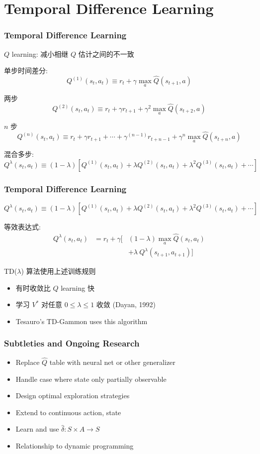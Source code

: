 \documentclass{beamer}
\begin{document}
\section{Temporal Difference Learning}
\label{sec-5}
\begin{frame}
\frametitle{Temporal Difference Learning}
\label{sec-5-1}

$Q$ learning: 减小相继 $Q$ 估计之间的不一致

单步时间差分:
\[Q^{(1)}(s_t,a_t) \equiv r_t + \gamma \max_{a} \hat{Q}(s_{t+1},a)\]

两步
\[Q^{(2)}(s_t,a_t) \equiv r_t + \gamma r_{t+1} + \gamma^2 \max_{a}\hat{Q}(s_{t+2},a) \]

 $n$ 步
\[ Q^{(n)}(s_t,a_t) \equiv r_t + \gamma r_{t+1} + \cdots + \gamma^{(n-1)}r_{t+n-1} + \gamma^n \max_{a}\hat{Q}(s_{t+n},a) \]

混合多步:
\[Q^{\lambda}(s_{t},a_{t})  \equiv (1- \lambda) \left[
Q^{(1)}(s_t,a_t) + \lambda Q^{(2)}(s_t,a_t) + \lambda^2 Q^{(3)}(s_t,a_t) +
\cdots \right] \]
\end{frame}
\begin{frame}
\frametitle{Temporal Difference Learning}
\label{sec-5-2}

\[Q^{\lambda}(s_{t},a_{t})  \equiv (1- \lambda) \left[
Q^{(1)}(s_t,a_t) + \lambda Q^{(2)}(s_t,a_t) + \lambda^2 Q^{(3)}(s_t,a_t) +
\cdots \right] \]

等效表达式:
\begin{eqnarray*}
 Q^{\lambda}(s_{t},a_{t}) & = r_{t} + \gamma [ & (1 -
\lambda)
\max_{a}\hat{Q}(s_{t},a_{t}) \\
 & & + \lambda \ Q^{\lambda}(s_{t+1},a_{t+1})]
\end{eqnarray*}


TD($\lambda$) 算法使用上述训练规则
\begin{itemize}
\item 有时收敛比 $Q$ learning 快
\item 学习 $V^*$ 对任意 $0 \leq \lambda \leq 1$ 收敛 (Dayan, 1992)
\item Tesauro's TD-Gammon uses this algorithm
\end{itemize}
\end{frame}
\begin{frame}
\frametitle{Subtleties and Ongoing Research}
\label{sec-5-3}


\begin{itemize}
\item Replace $\hat{Q}$ table with neural net or other generalizer
\item Handle case where state only partially observable
\item Design optimal exploration strategies
\item Extend to continuous action, state
\item Learn and use $\hat{\delta}: S \times A \rightarrow S$
\item Relationship to dynamic programming
\end{itemize}
\end{frame}
\end{document}
